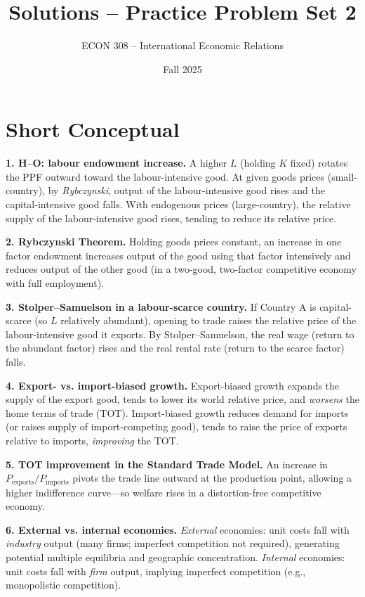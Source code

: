 \documentclass[12pt]{article}
\title{Solutions -- Practice Problem Set 2}
\author{ECON 308 -- International Economic Relations}
\date{Fall 2025}
\begin{document}
\maketitle

\section*{Short Conceptual}

\textbf{1. H--O: labour endowment increase.} A higher $L$ (holding $K$ fixed) rotates the PPF outward toward the labour-intensive good. At given goods prices (small-country), by \textit{Rybczynski}, output of the labour-intensive good rises and the capital-intensive good falls. With endogenous prices (large-country), the relative supply of the labour-intensive good rises, tending to reduce its relative price.

\medskip
\textbf{2. Rybczynski Theorem.} Holding goods prices constant, an increase in one factor endowment increases output of the good using that factor intensively and reduces output of the other good (in a two-good, two-factor competitive economy with full employment).

\medskip
\textbf{3. Stolper--Samuelson in a labour-scarce country.} If Country A is capital-scarce (so $L$ relatively abundant), opening to trade raises the relative price of the labour-intensive good it exports. By Stolper--Samuelson, the real wage (return to the abundant factor) rises and the real rental rate (return to the scarce factor) falls.

\medskip
\textbf{4. Export- vs. import-biased growth.} Export-biased growth expands the supply of the export good, tends to lower its world relative price, and \emph{worsens} the home terms of trade (TOT). Import-biased growth reduces demand for imports (or raises supply of import-competing good), tends to raise the price of exports relative to imports, \emph{improving} the TOT.

\medskip
\textbf{5. TOT improvement in the Standard Trade Model.} An increase in $P_{\text{exports}}/P_{\text{imports}}$ pivots the trade line outward at the production point, allowing a higher indifference curve---so welfare rises in a distortion-free competitive economy.

\medskip
\textbf{6. External vs. internal economies.} \emph{External} economies: unit costs fall with \emph{industry} output (many firms; imperfect competition not required), generating potential multiple equilibria and geographic concentration. \emph{Internal} economies: unit costs fall with \emph{firm} output, implying imperfect competition (e.g., monopolistic competition).
\end{document}
